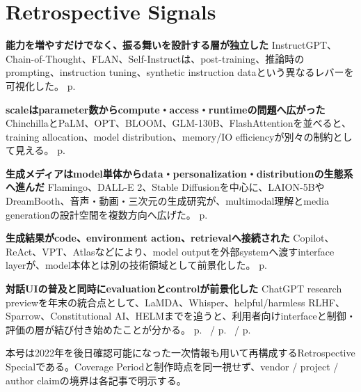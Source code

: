 \section*{Retrospective Signals}
\smallskip
\noindent \textbf{能力を増やすだけでなく、振る舞いを設計する層が独立した} InstructGPT、Chain-of-Thought、FLAN、Self-Instructは、post-training、推論時のprompting、instruction tuning、synthetic instruction dataという異なるレバーを可視化した。 \hfill{\footnotesize p.~\pageref{pkg:steering-reasoning}}
\par
\smallskip
\noindent \textbf{scaleはparameter数からcompute・access・runtimeの問題へ広がった} ChinchillaとPaLM、OPT、BLOOM、GLM-130B、FlashAttentionを並べると、training allocation、model distribution、memory/IO efficiencyが別々の制約として見える。 \hfill{\footnotesize p.~\pageref{pkg:scale-access-systems}}
\par
\smallskip
\noindent \textbf{生成メディアはmodel単体からdata・personalization・distributionの生態系へ進んだ} Flamingo、DALL-E 2、Stable Diffusionを中心に、LAION-5BやDreamBooth、音声・動画・三次元の生成研究が、multimodal理解とmedia generationの設計空間を複数方向へ広げた。 \hfill{\footnotesize p.~\pageref{pkg:multimodal-media}}
\par
\smallskip
\noindent \textbf{生成結果がcode、environment action、retrievalへ接続された} Copilot、ReAct、VPT、Atlasなどにより、model outputを外部systemへ渡すinterface layerが、model本体とは別の技術領域として前景化した。 \hfill{\footnotesize p.~\pageref{pkg:code-action-retrieval}}
\par
\smallskip
\noindent \textbf{対話UIの普及と同時にevaluationとcontrolが前景化した} ChatGPT research previewを年末の統合点として、LaMDA、Whisper、helpful/harmless RLHF、Sparrow、Constitutional AI、HELMまでを追うと、利用者向けinterfaceと制御・評価の層が結び付き始めたことが分かる。 \hfill{\footnotesize p.~\pageref{pkg:dialogue-interface-control} / p.~\pageref{pkg:evaluation-layer} / p.~\pageref{pkg:annual-synthesis}}
\par
\medskip
\begin{claimboundary}
本号は2022年を後日確認可能になった一次情報も用いて再構成するRetrospective Specialである。Coverage Periodと制作時点を同一視せず、vendor / project / author claimの境界は各記事で明示する。
\end{claimboundary}
\medskip
\tableofcontents
